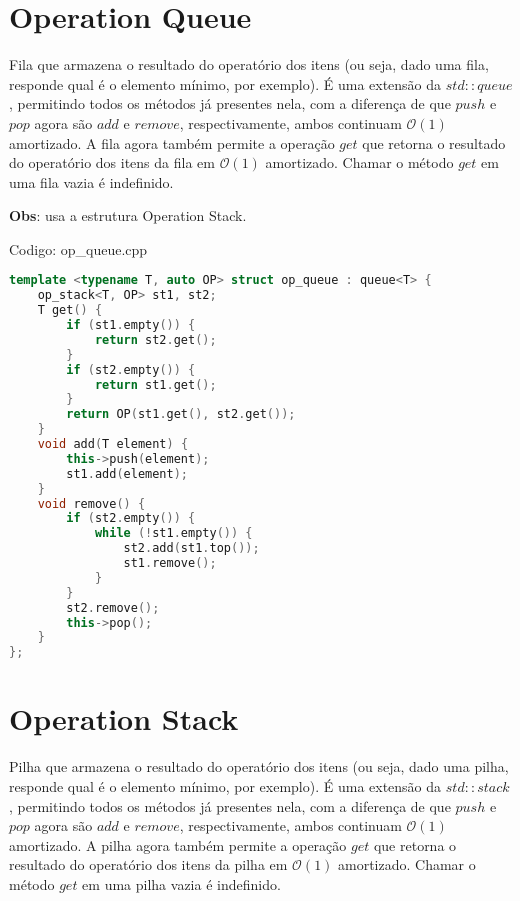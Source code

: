 \documentclass[10pt, a4paper, oneside]{book}
\begin{document}
\section{Operation Queue}


Fila que armazena o resultado do operatório dos itens (ou seja, dado uma fila, responde qual é o elemento mínimo, por exemplo). É uma extensão da $std::queue$, permitindo todos os métodos já presentes nela, com a diferença de que $push$ e $pop$ agora são $add$ e $remove$, respectivamente, ambos continuam $\mathcal{O}(1)$ amortizado. A fila agora também permite a operação $get$ que retorna o resultado do operatório dos itens da fila em $\mathcal{O}(1)$ amortizado. Chamar o método $get$ em uma fila vazia é indefinido.



\textbf{Obs}: usa a estrutura Operation Stack.

\hfill

Codigo: op\_queue.cpp

\begin{lstlisting}[language=C++]
template <typename T, auto OP> struct op_queue : queue<T> {
    op_stack<T, OP> st1, st2;
    T get() {
        if (st1.empty()) {
            return st2.get();
        }
        if (st2.empty()) {
            return st1.get();
        }
        return OP(st1.get(), st2.get());
    }
    void add(T element) {
        this->push(element);
        st1.add(element);
    }
    void remove() {
        if (st2.empty()) {
            while (!st1.empty()) {
                st2.add(st1.top());
                st1.remove();
            }
        }
        st2.remove();
        this->pop();
    }
};\end{lstlisting}
\hfill

\section{Operation Stack}


Pilha que armazena o resultado do operatório dos itens (ou seja, dado uma pilha, responde qual é o elemento mínimo, por exemplo). É uma extensão da $std::stack$, permitindo todos os métodos já presentes nela, com a diferença de que $push$ e $pop$ agora são $add$ e $remove$, respectivamente, ambos continuam $\mathcal{O}(1)$ amortizado. A pilha agora também permite a operação $get$ que retorna o resultado do operatório dos itens da pilha em $\mathcal{O}(1)$ amortizado. Chamar o método $get$ em uma pilha vazia é indefinido.
\end{document}
